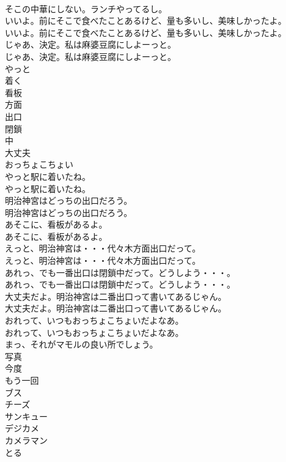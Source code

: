 \documentclass[8pt]{extreport}
\begin{document}
\begin{CJK}{UTF8}{min}
\\	そこの中華にしない。ランチやってるし。 
\\	いいよ。前にそこで食べたことあるけど、量も多いし、美味しかったよ。	
\\	いいよ。前にそこで食べたことあるけど、量も多いし、美味しかったよ。 
\\	じゃあ、決定。私は麻婆豆腐にしよーっと。	
\\	じゃあ、決定。私は麻婆豆腐にしよーっと。 
\\	やっと
\\	着く
\\	看板
\\	方面
\\	出口
\\	閉鎖
\\	中
\\	大丈夫
\\	おっちょこちょい
\\	やっと駅に着いたね。	
\\	やっと駅に着いたね。 
\\	明治神宮はどっちの出口だろう。	
\\	明治神宮はどっちの出口だろう。 
\\	あそこに、看板があるよ。	
\\	あそこに、看板があるよ。 
\\	えっと、明治神宮は・・・代々木方面出口だって。	
\\	えっと、明治神宮は・・・代々木方面出口だって。 
\\	あれっ、でも一番出口は閉鎖中だって。どうしよう・・・。	
\\	あれっ、でも一番出口は閉鎖中だって。どうしよう・・・。 
\\	大丈夫だよ。明治神宮は二番出口って書いてあるじゃん。	
\\	大丈夫だよ。明治神宮は二番出口って書いてあるじゃん。 
\\	おれって、いつもおっちょこちょいだよなあ。	
\\	おれって、いつもおっちょこちょいだよなあ。 
\\	まっ、それがマモルの良い所でしょう。 
\\	写真
\\	今度
\\	もう一回
\\	ブス
\\	チーズ
\\	サンキュー
\\	デジカメ
\\	カメラマン
\\	とる

\end{CJK}
\end{document}
